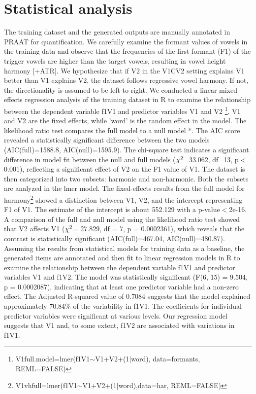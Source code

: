 \documentclass{Interspeech2024}
\begin{document}
\section{Statistical analysis}
The training dataset and the generated outputs are manually annotated in PRAAT \cite{boersma_praat_2009} for quantification. We carefully examine the formant values of vowels in the training data and observe that the frequencies of the first formant (F1) of the trigger vowels are higher than the target vowels, resulting in vowel height harmony [+ATR]. We hypothesize that if V2 in the V1CV2 setting explains V1 better than V1 explains V2, the dataset follows regressive vowel harmony. If not, the directionality is assumed to be left-to-right. We conducted a linear mixed effects regression analysis \cite{bates_fitting_2015} of the training dataset in R\cite{r_core_team_r_2021} to examine the relationship between the dependent variable f1V1 and predictor variables V1 and V2 \footnote{V1full.model=lmer(f1V1$\sim$V1+V2+(1$\vert$word), data=formants, REML=FALSE)}. V1 and V2 are the fixed effects, while 'word' is the random effect in the model. The likelihood ratio test compares the full model to a null model *. The AIC score revealed a statistically significant difference between the two models (AIC(full)=1588.8, AIC(null)=1595.9). The chi-square test indicates a significant difference in model fit between the null and full models ($\chi\textsuperscript{2}$=33.062, df=13, p$<$0.001), reflecting a significant effect of V2 on the F1 value of V1. The dataset is then categorized into two subsets: harmonic and non-harmonic. Both the subsets are analyzed in the lmer model. The fixed-effects results from the full model for harmony\footnote{V1vhfull=lmer(f1V1$\sim$V1+V2+(1$\vert$word),data=har, REML=FALSE)} showed a distinction between V1, V2, and the intercept representing F1 of V1. The estimate of the intercept is about 552.129 with a p-value$<$2e-16. A comparison of the full and null model using the likelihood ratio test showed that V2 affects V1 ($\chi\textsuperscript{2}$= 27.829, df = 7, p = 0.0002361), which reveals that the contrast is statistically significant (AIC(full)=467.04, AIC(null)=480.87).  Assuming the results from statistical models for training data as a baseline, the generated items are annotated and then fit to linear regression models in R to examine the relationship between the dependent variable f1V1 and predictor variables V1 and f1V2. The model was statistically significant (F(6, 15) = 9.504, p = 0.0002087), indicating that at least one predictor variable had a non-zero effect. The Adjusted R-squared value of 0.7084 suggests that the model explained approximately 70.84\% of the variability in f1V1. The coefficients for individual predictor variables were significant at various levels. Our regression model suggests that V1 and, to some extent, f1V2 are associated with variations in f1V1.
\end{document}
